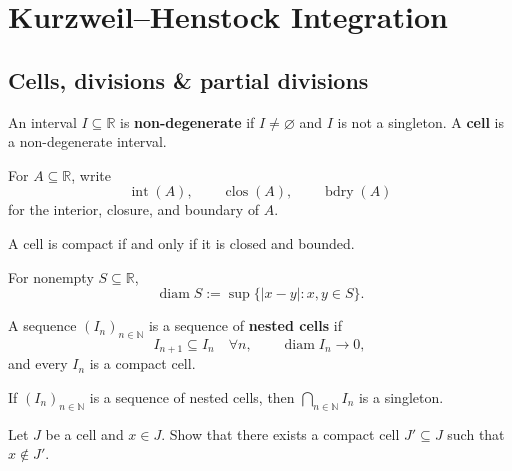 \chapter{Kurzweil--Henstock Integration}


\section{Cells, divisions \& partial divisions}

\begin{definitionenv}
An interval $I\subseteq\mathbb R$ is \textbf{non-degenerate} if
$I\neq\varnothing$ and $I$ is not a singleton. A \textbf{cell} is a
non-degenerate interval.
\end{definitionenv}

\begin{notationenv}
For $A\subseteq\mathbb R$, write
\[
    \operatorname{int}(A),\qquad
    \operatorname{clos}(A),\qquad
    \operatorname{bdry}(A)
\]
for the interior, closure, and boundary of $A$.
\end{notationenv}

\begin{propositionenv}
A cell is compact if and only if it is closed and bounded.
\end{propositionenv}

\begin{definitionenv}
For nonempty $S\subseteq\mathbb R$,
\[
    \operatorname{diam}S
    :=
    \sup\{|x-y|:x,y\in S\}.
\]
\end{definitionenv}

\begin{definitionenv}
A sequence $(I_n)_{n\in\mathbb N}$ is a sequence of \textbf{nested cells} if
\[
    I_{n+1}\subseteq I_n\quad\forall n,
    \qquad
    \operatorname{diam}I_n\to0,
\]
and every $I_n$ is a compact cell.
\end{definitionenv}

\begin{theoremenv}
If $(I_n)_{n\in\mathbb N}$ is a sequence of nested cells, then
$\bigcap_{n\in\mathbb N}I_n$ is a singleton.
\end{theoremenv}

\begin{exerciseenv}
Let $J$ be a cell and $x\in J$. Show that there exists a compact cell
$J'\subseteq J$ such that $x\notin J'$.
\end{exerciseenv}

